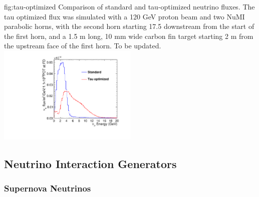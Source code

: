 \begin{dunefigure}{fig:tau-optimized}
{Comparison of standard and tau-optimized neutrino fluxes.  The tau optimized flux was simulated with a 120 GeV proton beam and two NuMI parabolic horns, with the second horn starting 17.5 downstream from the start of the first horn, and a 1.5 m long, 10 mm wide carbon fin target starting 2 m from the upstream face of the first horn.  To be updated.  }
\includegraphics[width=0.5\textwidth]{graphics/tau_vs_nominal_neutrino_fd.pdf}
\end{dunefigure}




\subsection{Neutrino Interaction Generators} 
\label{sec:tools-mc-gen}




\subsubsection{Supernova Neutrinos}

